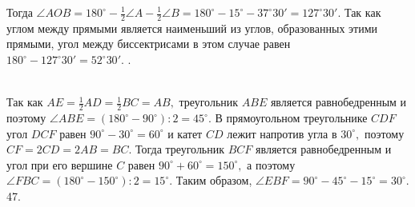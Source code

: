 \documentclass[12pt]{article}
\begin{document}
Тогда $\angle AOB=180^\circ-\frac{1}{2}\angle A-\frac{1}{2}\angle B=180^\circ-15^\circ-37^\circ30'=127^\circ30'.$ Так как углом между прямыми является наименьший из углов, образованных этими прямыми, угол между биссектрисами в этом случае равен $180^\circ-127^\circ30'=52^\circ30'.$\newpage
{}. \begin{figure}[ht!]
\end{figure}\\
Так как $AE=\frac{1}{2}AD=\frac{1}{2}BC=AB,$ треугольник $ABE$ является равнобедренным и поэтому $\angle ABE=(180^\circ-90^\circ):2=45^\circ.$ В прямоугольном треугольнике $CDF$ угол $DCF$ равен $90^\circ-30^\circ=60^\circ$ и катет $CD$ лежит напротив угла в $30^\circ,$ поэтому $CF=2CD=2AB=BC.$ Тогда треугольник $BCF$ является равнобедренным и угол при его вершине $C$ равен $90^\circ+60^\circ=150^\circ,$ а поэтому $\angle FBC=(180^\circ-150^\circ):2=15^\circ.$ Таким образом, $\angle EBF=90^\circ-45^\circ-15^\circ=30^\circ.$\\
47. \begin{figure}[ht!]
\end{figure}\\
\end{document}

